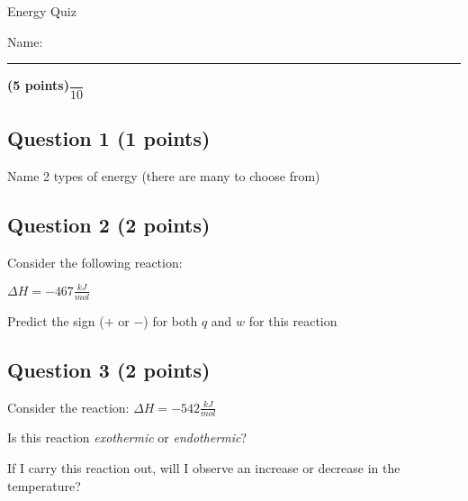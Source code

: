 \documentclass[12pt, letterpaper]{memoir}
\begin{document}
	\begin{center}
		{\large Energy Quiz}
	\end{center}
	{\large Name: \rule[-1mm]{4in}{.1pt} {\bfseries (5 points)}\hspace{4em}$\dfrac{~}{10}$} 
	
	\subsection*{Question 1 (1 points)}
	Name 2 types of energy (there are many to choose from)
	
	\vspace{8em}
	\subsection*{Question 2 (2 points)}
	Consider the following reaction:
	
	\noindent
	 \hspace{2em} $\Delta H=-467\frac{kJ}{mol}$
	
	\noindent Predict the sign ($+$ or $-$) for both $q$ and $w$ for this reaction
	
	\vspace{8em}
	\subsection*{Question 3 (2 points)}
	Consider the reaction:  \hspace{2em} $\Delta H=-542\frac{kJ}{mol}$
	
	\noindent Is this reaction \emph{exothermic} or \emph{endothermic}?
	
	\vspace{6em}
	\noindent If I carry this reaction out, will I observe an increase or decrease in the temperature?
\end{document}
